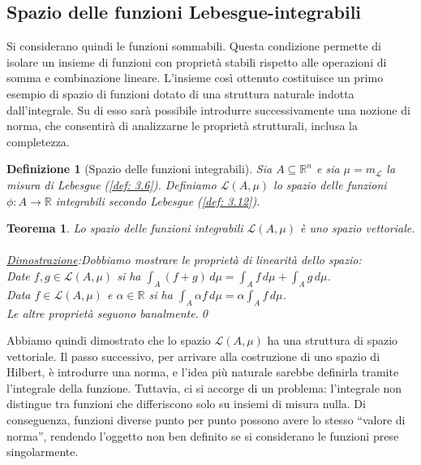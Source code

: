 \documentclass[a4paper,12pt]{report}
\newtheorem{teorema}{Teorema}[chapter]
\newtheorem{definizione}{Definizione}[chapter]
\begin{document}
\newpage

\subsection{Spazio delle funzioni Lebesgue-integrabili}\label{sec: 3.1.4}

Si considerano quindi le funzioni sommabili. Questa condizione permette di isolare un insieme di funzioni con proprietà stabili rispetto alle operazioni di somma e combinazione lineare.
L’insieme così ottenuto costituisce un primo esempio di spazio di funzioni dotato di una struttura naturale indotta dall’integrale. Su di esso sarà possibile introdurre successivamente una nozione di norma, che consentirà di analizzarne le proprietà strutturali, inclusa la completezza.

\begin{definizione}[Spazio delle funzioni integrabili]
    Sia $A \subseteq \mathbb{R}^n$ e sia $\mu=m_{\mathscr{L}}$ la misura di Lebesgue (\ref{def: 3.6}). Definiamo $\mathcal{L}(A,\mu)$ lo spazio delle funzioni $\phi: A \to \mathbb{R}$ integrabili secondo Lebesgue (\ref{def: 3.12}).
\end{definizione}

\begin{teorema}
    Lo spazio delle funzioni integrabili $\mathcal{L}(A,\mu)$ è uno spazio vettoriale.
    \\
    \\ \underline{Dimostrazione}:Dobbiamo mostrare le proprietà di linearità dello spazio:
    \\Date $f,g \in \mathcal{L}(A,\mu)$ si ha $\displaystyle\int_A(f+g)\,d\mu=\int_A f\,d\mu+\int_Ag\,d\mu$.
    \\ Data $f\in \mathcal{L}(A,\mu)$ e $\alpha \in \mathbb{R}$ si ha $\displaystyle\int_A\alpha f \,d\mu=\alpha\int_Af\,d\mu$.
    \\ Le altre proprietà seguono banalmente.\qed 
\end{teorema}

Abbiamo quindi dimostrato che lo spazio $\mathcal{L}(A, \mu)$ ha una struttura di spazio vettoriale. Il passo successivo, per arrivare alla costruzione di uno spazio di Hilbert, è introdurre una norma, e l’idea più naturale sarebbe definirla tramite l’integrale della funzione.
Tuttavia, ci si accorge di un problema: l’integrale non distingue tra funzioni che differiscono solo su insiemi di misura nulla. Di conseguenza, funzioni diverse punto per punto possono avere lo stesso “valore di norma”, rendendo l’oggetto non ben definito se si considerano le funzioni prese singolarmente.
\end{document}
